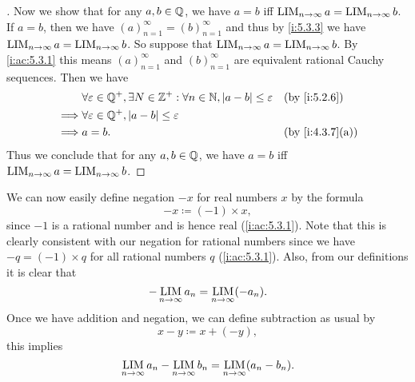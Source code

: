 \begin{proof}[]
  Now we show that for any \(a, b \in \mathbb{Q}\), we have \(a = b\) iff \(\operatorname*{LIM}_{n \to \infty} a = \operatorname*{LIM}_{n \to \infty} b\).
  If \(a = b\), then we have \((a)_{n = 1}^\infty = (b)_{n = 1}^\infty\) and thus by \cref{i:5.3.3} we have \(\operatorname*{LIM}_{n \to \infty} a = \operatorname*{LIM}_{n \to \infty} b\).
  So suppose that \(\operatorname*{LIM}_{n \to \infty} a = \operatorname*{LIM}_{n \to \infty} b\).
  By \cref{i:ac:5.3.1} this means \((a)_{n = 1}^\infty\) and \((b)_{n = 1}^\infty\) are equivalent rational Cauchy sequences.
  Then we have
  \begin{align*}
             & \forall \varepsilon \in \Q^+, \exists N \in \Z^+ : \forall n \in \N, \abs{a - b} \leq \varepsilon &  & \by{i:5.2.6}    \\
    \implies & \forall \varepsilon \in \Q^+, \abs{a - b} \leq \varepsilon                                                             \\
    \implies & a = b.                                                                                            &  & \by{i:4.3.7}[a]
  \end{align*}
  Thus we conclude that for any \(a, b \in \mathbb{Q}\), we have \(a = b\) iff \(\operatorname*{LIM}_{n \to \infty} a = \operatorname*{LIM}_{n \to \infty} b\).
\end{proof}

\begin{ac}\label{i:ac:5.3.2}
  We can now easily define negation \(-x\) for real numbers \(x\) by the formula
  \[
    -x \coloneqq (-1) \times x,
  \]
  since \(-1\) is a rational number and is hence real (\cref{i:ac:5.3.1}).
  Note that this is clearly consistent with our negation for rational numbers since we have \(-q = (-1) \times q\) for all rational numbers \(q\) (\cref{i:ac:5.3.1}).
  Also, from our definitions it is clear that
  \[
    -\operatorname*{LIM}_{n \to \infty} a_n = \operatorname*{LIM}_{n \to \infty} (-a_n).
  \]
  Once we have addition and negation, we can define subtraction as usual by
  \[
    x - y \coloneqq x + (-y),
  \]
  this implies
  \[
    \operatorname*{LIM}_{n \to \infty} a_n - \operatorname*{LIM}_{n \to \infty} b_n = \operatorname*{LIM}_{n \to \infty} (a_n - b_n).
  \]
\end{ac}


